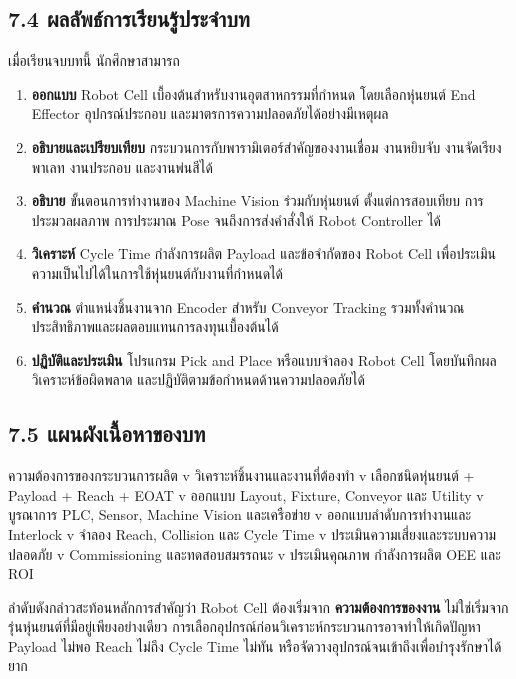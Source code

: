 


\subsection{7.4 ผลลัพธ์การเรียนรู้ประจำบท}

เมื่อเรียนจบบทนี้ นักศึกษาสามารถ

\begin{enumerate}
    \item \textbf{ออกแบบ} Robot Cell เบื้องต้นสำหรับงานอุตสาหกรรมที่กำหนด โดยเลือกหุ่นยนต์ End Effector อุปกรณ์ประกอบ และมาตรการความปลอดภัยได้อย่างมีเหตุผล
    \item \textbf{อธิบายและเปรียบเทียบ} กระบวนการกับพารามิเตอร์สำคัญของงานเชื่อม งานหยิบจับ งานจัดเรียงพาเลท งานประกอบ และงานพ่นสีได้
    \item \textbf{อธิบาย} ขั้นตอนการทำงานของ Machine Vision ร่วมกับหุ่นยนต์ ตั้งแต่การสอบเทียบ การประมวลผลภาพ การประมาณ Pose จนถึงการส่งคำสั่งให้ Robot Controller ได้
    \item \textbf{วิเคราะห์} Cycle Time กำลังการผลิต Payload และข้อจำกัดของ Robot Cell เพื่อประเมินความเป็นไปได้ในการใช้หุ่นยนต์กับงานที่กำหนดได้
    \item \textbf{คำนวณ} ตำแหน่งชิ้นงานจาก Encoder สำหรับ Conveyor Tracking รวมทั้งคำนวณประสิทธิภาพและผลตอบแทนการลงทุนเบื้องต้นได้
    \item \textbf{ปฏิบัติและประเมิน} โปรแกรม Pick and Place หรือแบบจำลอง Robot Cell โดยบันทึกผล วิเคราะห์ข้อผิดพลาด และปฏิบัติตามข้อกำหนดด้านความปลอดภัยได้
\end{enumerate}



\subsection{7.5 แผนผังเนื้อหาของบท}

\begin{center}
ความต้องการของกระบวนการผลิต       
          v
วิเคราะห์ชิ้นงานและงานที่ต้องทำ
          v
เลือกชนิดหุ่นยนต์ + Payload + Reach + EOAT
          v
ออกแบบ Layout, Fixture, Conveyor และ Utility      
          v
บูรณาการ PLC, Sensor, Machine Vision และเครือข่าย 
          v
ออกแบบลำดับการทำงานและ Interlock   
          v
จำลอง Reach, Collision และ Cycle Time   
          v
ประเมินความเสี่ยงและระบบความปลอดภัย     
          v
Commissioning และทดสอบสมรรถนะ 
          v
ประเมินคุณภาพ กำลังการผลิต OEE และ ROI
\end{center}
ลำดับดังกล่าวสะท้อนหลักการสำคัญว่า Robot Cell ต้องเริ่มจาก \textbf{ความต้องการของงาน} ไม่ใช่เริ่มจากรุ่นหุ่นยนต์ที่มีอยู่เพียงอย่างเดียว การเลือกอุปกรณ์ก่อนวิเคราะห์กระบวนการอาจทำให้เกิดปัญหา Payload ไม่พอ Reach ไม่ถึง Cycle Time ไม่ทัน หรือจัดวางอุปกรณ์จนเข้าถึงเพื่อบำรุงรักษาได้ยาก



